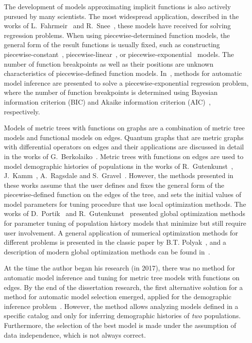 The development of models approximating implicit functions is also actively pursued by many scientists.
The most widespread application, described in the works of L.~Fahrmeir~\cite{fahrmeir2013regression} and R.~Snee~\cite{snee1977validation}, these models have received for solving regression problems.
When using piecewise-determined function models, the general form of the result functions is usually fixed, such as constructing piecewise-constant~\cite{schiffels2020msmc,dai2008nonlinear}, piecewise-linear~\cite{leenaerts2013piecewise}, or piecewise-exponential~\cite{friedman1982piecewise} models.
The number of function breakpoints as well as their positions are unknown characteristics of piecewise-defined function models.
In~\cite{muggeo2020selecting,malash2010piecewise}, methods for automatic model inference are presented to solve a piecewise-exponential regression problem, where the number of function breakpoints is determined using Bayesian information criterion (BIC) and Akaike information criterion (AIC)~\cite{akaike1974new}, respectively.

Models of metric trees with functions on graphs are a combination of metric tree models and functional models on edges.
Quantum graphs that are metric graphs with differential operators on edges and their applications are discussed in detail in the works of G.~Berkolaiko~\cite{berkolaiko2006quantum,berkolaiko2013introduction}.
Metric trees with functions on edges are used to model demographic histories of populations in the works of R.~Gutenkunst~\cite{gutenkunst2009inferring}, J.~Kamm~\cite{kamm2020efficiently}, A.~Ragsdale and S.~Gravel~\cite{ragsdale2019models, ragsdale2020unbiased}.
However, the methods presented in these works assume that the user defines and fixes the general form of the piecewise-defined function on the edges of the tree, and sets the initial values of model parameters for tuning procedure that use local optimization methods.
The works of D.~Portik~\cite{portik2017evaluating, leache2019exploring} and R.~Gutenkunst~\cite{blischak2020inferring} presented global optimization methods for parameter tuning of population history models that minimize but still require user involvement.
A general application of numerical optimization methods for different problems is presented in the classic paper by B.T. Polyak~\cite{поляк1983введение}, and a description of modern global optimization methods can be found in~\cite{пантелеев2013методы}.

At the time the author began his research (in 2017), there was no method for automatic model inference and tuning for metric tree models with functions on edges.
By the end of the dissertation research, the first alternative solution for a method for automatic model selection emerged, applied for the demographic inference problem~\cite{rippe2021environmental}.
However, the method allows analyzing models defined in a specific catalog and only for inferring demographic histories of \emph{two} populations.
Furthermore, the selection of the best model is made under the assumption of data independence, which is not always correct.\\

